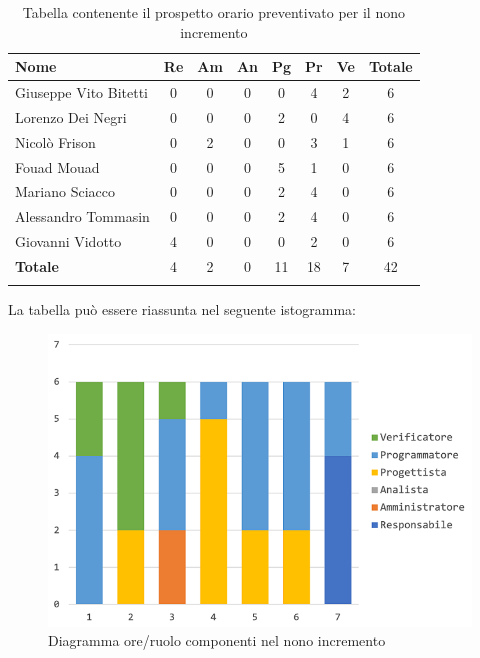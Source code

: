 		\begin{longtable}{|l|c|c|c|c|c|c|c|}
			\hline
			\rowcolor{lighter-grayer}
			\textbf{Nome} & \textbf{Re} & \textbf{Am} & \textbf{An} & \textbf{Pg}  & \textbf{Pr}   & \textbf{Ve} & \textbf{Totale} \\
			\hline
			\endfirsthead
			
			\hline
			Giuseppe Vito Bitetti 		 & 0 & 0 & 0 & 0 & 4 & 2 & 6\\
			\hline
			\hline
			Lorenzo Dei Negri			 & 0 & 0 & 0 & 2 & 0 & 4 & 6\\
			\hline
			\hline
			Nicolò Frison				      & 0 & 2 & 0 & 0 & 3 & 1 & 6\\
			\hline
			\hline
			Fouad Mouad 				   & 0 & 0 & 0 & 5 & 1 & 0 & 6\\
			\hline
			\hline
			Mariano Sciacco 			 & 0 & 0 & 0 & 2 & 4 & 0 & 6\\
			\hline
			\hline
			Alessandro Tommasin    & 0 & 0 & 0 & 2 & 4 & 0 & 6\\
			\hline
			\hline
			Giovanni Vidotto 			  & 4 & 0 & 0 & 0 & 2 & 0 & 6\\
			\hline 
			\textbf{Totale}			 		& 4 & 2 & 0 & 11 & 18 & 7 & 42\\
			\hline
			\caption{Tabella contenente il prospetto orario preventivato per il nono incremento}
		\end{longtable}
		
		La tabella può essere riassunta nel seguente istogramma:
		\begin{figure}[H]
			\centering
			\includegraphics[width=0.75\linewidth]{./images/preventivo/incremento9-1.png}
			\caption{Diagramma ore/ruolo componenti nel nono incremento}
			\label{fig:diagramma suddivione ruoli incremento IX}
		\end{figure}
		
